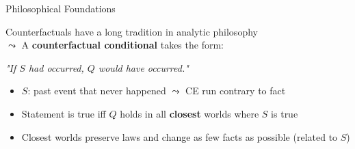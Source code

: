 \documentclass[11pt,compress,t,notes=noshow, aspectratio=169, xcolor=table, usenames,dvipsnames]{beamer}
\begin{document}
\begin{frame}{Philosophical Foundations }

Counterfactuals have a long tradition in analytic philosophy\\
$\leadsto$ A \textbf{counterfactual conditional} takes the form:

\begin{center}
  \emph{"If $S$ had occurred, $Q$ would have occurred."}
\end{center}

  \begin{itemize}%
    \item $S$: past event that never happened 
    $\leadsto$ CE run contrary to fact
    \item Statement is true iff $Q$ holds in all \textbf{closest} worlds where $S$ is true
    \item Closest worlds preserve laws and change as few facts as possible (related to $S$)
  \end{itemize}
\end{frame}
\end{document}
